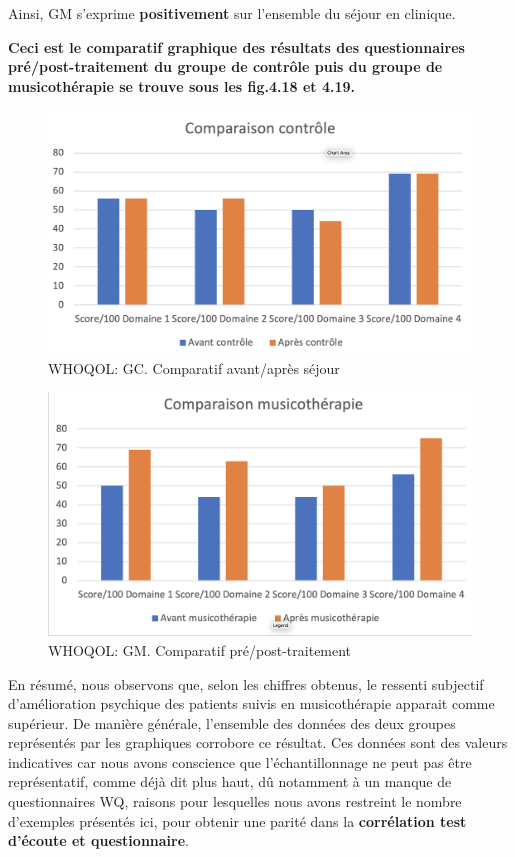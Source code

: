                  Ainsi,  GM s'exprime
                 \textbf{positivement }
                 sur l'ensemble du séjour en clinique.

               \textbf{ Ceci est le comparatif graphique  des résultats des
                 questionnaires pré/post-traitement du groupe de contrôle
                 puis du groupe de musicothérapie se trouve sous les fig.4.18 et 4.19.}
                
\begin{figure}
\centering
\includegraphics[width=0.7\linewidth]{images/Compcontrole.png}
\caption[Schéma du déroulement]{WHOQOL:  GC. Comparatif avant/après séjour}
       
\label{groupecontroleimage1}
\end{figure}

\begin{figure}
\centering
\includegraphics[width=0.7\linewidth]{images/Compmusico.png}
\caption[Schéma du déroulement]{ WHOQOL: GM. Comparatif pré/post-traitement }
       
\label{groupecontroleimage1}
\end{figure}



       En résumé, nous observons que, selon les chiffres obtenus, le ressenti
       subjectif d'amélioration psychique 
        des patients suivis en musicothérapie apparait comme
        supérieur.
        De manière générale, l'ensemble des données des deux groupes représentés
        par les graphiques corrobore ce résultat.
        Ces données sont des valeurs indicatives car nous avons conscience que l'échantillonnage ne
        peut pas être représentatif, comme déjà dit plus haut, dû
        notamment à un
        manque de
        questionnaires WQ, raisons pour lesquelles nous avons
        restreint le nombre d'exemples présentés ici,  pour obtenir
        une parité dans la \textbf{corrélation test d'écoute et questionnaire}.
        

